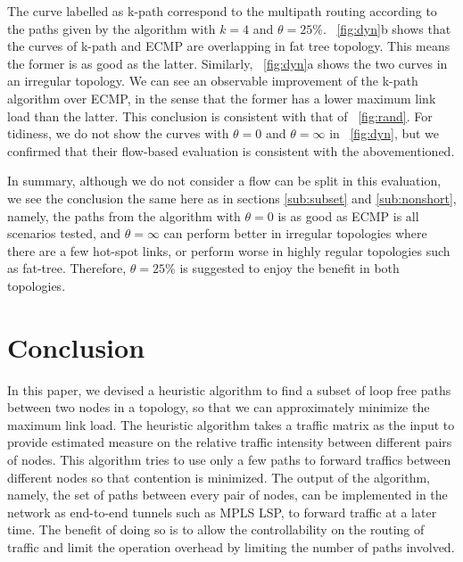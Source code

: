 \documentclass[conference]{IEEEtran}
\begin{document}
The curve labelled as k-path correspond to the multipath routing according to
the paths given by the algorithm with $k=4$ and $\theta=25\%$.
\figurename~\ref{fig:dyn}b shows that the curves of k-path and ECMP are
overlapping in fat tree topology. This means the former is as good as the
latter. Similarly, \figurename~\ref{fig:dyn}a shows the two curves in an
irregular topology. We can see an observable improvement of the k-path
algorithm over ECMP, in the sense that the former has a lower maximum link load
than the latter. This conclusion is consistent with that of
\figurename~\ref{fig:rand}. For tidiness, we do not show the curves with
$\theta=0$ and $\theta=\infty$ in \figurename~\ref{fig:dyn}, but we confirmed
that their flow-based evaluation is consistent with the abovementioned.

In summary, although we do not consider a flow can be split in this
evaluation, we see the conclusion the same here as in sections
\ref{sub:subset} and \ref{sub:nonshort}, namely, the paths from the algorithm with
$\theta=0$ is as good as ECMP is all scenarios tested, and $\theta=\infty$ can
perform better in irregular topologies where there are a few hot-spot links, or
perform worse in highly regular topologies such as fat-tree. Therefore,
$\theta=25\%$ is suggested to enjoy the benefit in both topologies.

\section{Conclusion}

In this paper, we devised a heuristic algorithm to find a subset of loop free
paths between two nodes in a topology, so that we can approximately minimize
the maximum link load. The heuristic algorithm takes a traffic matrix as the
input to provide estimated measure on the relative traffic intensity between
different pairs of nodes. This algorithm tries to use only a few paths to
forward traffics between different nodes so that contention is minimized. The
output of the algorithm, namely, the set of paths between every pair of nodes,
can be implemented in the network as end-to-end tunnels such as MPLS LSP, to
forward traffic at a later time. The benefit of doing so is to allow the
controllability on the routing of traffic and limit the operation overhead by
limiting the number of paths involved.
\end{document}
